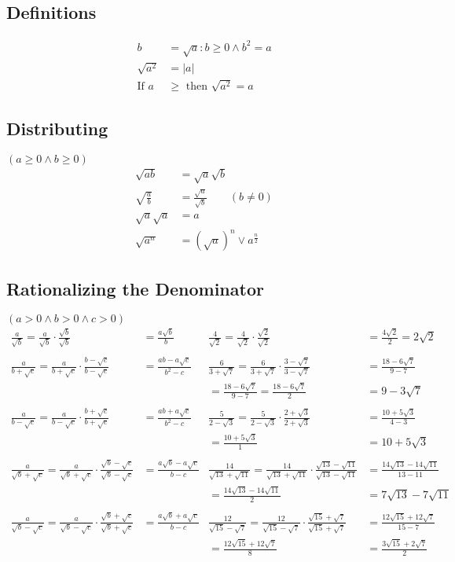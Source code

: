 \subsection{Definitions}
\begin{align*}
b&=\sqrt{a} : b \geq 0 \wedge b^2=a \\
\sqrt{a^2}&= \vert a \vert \\
\text{If } a&\geq \text{ then } \sqrt{a^2}=a
\end{align*}
\subsection{Distributing}
$(a\geq 0 \wedge b\geq 0)$
\begin{align*}
\sqrt{ab}&=\sqrt{a}\sqrt{b} \\
\sqrt{\frac{a}{b}}&= \frac{\sqrt{a}}{\sqrt{b}}\qquad(b\neq 0) \\
\sqrt{a}\sqrt{a}&=a\\
\sqrt{a^n}&=\left( \sqrt{a} \right) ^n \vee a^{\frac{n}{2}}
\end{align*}
\subsection{Rationalizing the Denominator}
$(a>0 \wedge b>0 \wedge c>0)$
\begin{align*}
\frac{a}{\sqrt{b}}=\frac{a}{\sqrt{b}}\cdot\frac{\sqrt{b}}{\sqrt{b}}&=\frac{a\sqrt{b}}{b} 
&
\frac{4}{\sqrt{2}}=\frac{4}{\sqrt{2}}\cdot\frac{\sqrt{2}}{\sqrt{2}}&=\frac{4\sqrt{2}}{2}=2\sqrt{2} \\ \\
\frac{a}{b+\sqrt{c}}=\frac{a}{b+\sqrt{c}}\cdot \frac{b-\sqrt{c}}{b-\sqrt{c}}&=\frac{ab-a\sqrt{c}}{b^2-c}
&
\frac{6}{3+\sqrt{7}}=\frac{6}{3+\sqrt{7}}\cdot\frac{3-\sqrt{7}}{3-\sqrt{7}}&=\frac{18-6\sqrt{7}}{9-7} \\
& & = \frac{18-6\sqrt{7}}{9-7}=\frac{18-6\sqrt{7}}{2}&=9-3\sqrt{7} \\ \\
\frac{a}{b-\sqrt{c}}=\frac{a}{b-\sqrt{c}} \cdot \frac{b+\sqrt{c}}{b+\sqrt{c}} &= \frac{ab+a\sqrt{c}}{b^2-c}
&
\frac{5}{2-\sqrt{3}}=\frac{5}{2-\sqrt{3}}\cdot\frac{2+\sqrt{3}}{2+\sqrt{3}}&=\frac{10+5\sqrt{3}}{4-3} \\
& & =\frac{10+5\sqrt{3}}{1}&=10+5\sqrt{3} \\ \\
\frac{a}{\sqrt{b}+\sqrt{c}}=\frac{a}{\sqrt{b}+\sqrt{c}}\cdot \frac{\sqrt{b}-\sqrt{c}}{\sqrt{b}-\sqrt{c}}&=\frac{a\sqrt{b}-a\sqrt{c}}{b-c}
&
\frac{14}{\sqrt{13}+\sqrt{11}}=\frac{14}{\sqrt{13}+\sqrt{11}}\cdot \frac{\sqrt{13}-\sqrt{11}}{\sqrt{13}-\sqrt{11}}&=\frac{14\sqrt{13}-14\sqrt{11}}{13-11}\\
& & = \frac{14\sqrt{13}-14\sqrt{11}}{2}&=7\sqrt{13}-7\sqrt{11} \\ \\
\frac{a}{\sqrt{b}-\sqrt{c}}=\frac{a}{\sqrt{b}-\sqrt{c}}\cdot \frac{\sqrt{b}+\sqrt{c}}{\sqrt{b}+\sqrt{c}}&=\frac{a\sqrt{b}+a\sqrt{c}}{b-c}
&
\frac{12}{\sqrt{15}-\sqrt{7}}=\frac{12}{\sqrt{15}-\sqrt{7}} \cdot \frac{\sqrt{15}+\sqrt{7}}{\sqrt{15}+\sqrt{7}}&=\frac{12\sqrt{15}+12\sqrt{7}}{15-7}\\
& & = \frac{12\sqrt{15}+12\sqrt{7}}{8}&=\frac{3\sqrt{15}+2\sqrt{7}}{2}
\end{align*}
